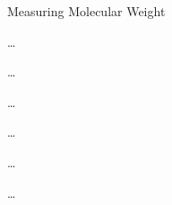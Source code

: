\begin{activity}{Measuring Molecular Weight}
\begin{infobox}
\end{infobox}

\begin{ctqs}
		
	\question \dots
	
\end{ctqs}



\begin{model}
\label{\labelbase:mdl:SEC}
	
	\dots

\end{model}

\begin{ctqs}

	\question \dots
	
\end{ctqs}



\begin{model}
	\label{\labelbase:mdl:MALDI}

	\dots

\end{model}

\begin{ctqs}

	\question \dots
		
\end{ctqs}


\begin{exercises}

	\exercise \dots
	
\end{exercises}


	
\end{activity}